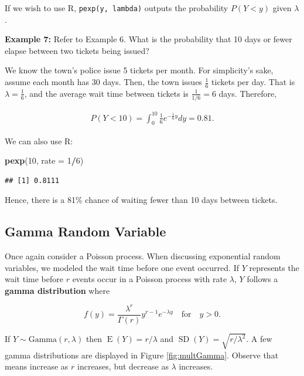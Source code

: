\documentclass[
]{krantz}
\newenvironment{Shaded}{\begin{snugshade}}{\end{snugshade}}
\newcommand{\AttributeTok}[1]{\textcolor[rgb]{0.27,0.27,0.27}{#1}}
\newcommand{\DecValTok}[1]{\textcolor[rgb]{0.06,0.06,0.06}{#1}}
\newcommand{\FunctionTok}[1]{\textcolor[rgb]{0.27,0.27,0.27}{\textbf{#1}}}
\newcommand{\NormalTok}[1]{#1}
\newcommand{\SpecialCharTok}[1]{\textcolor[rgb]{0.43,0.43,0.43}{\textbf{#1}}}
\newcommand{\E}{\operatorname{E}}
\newcommand{\SD}{\operatorname{SD}}
\begin{document}
If we wish to use R, \texttt{pexp(y,\ lambda)} outputs the probability \(P(Y < y)\) given \(\lambda\).

\textbf{Example 7:} Refer to Example 6. What is the probability that 10 days or fewer elapse between two tickets being issued?

We know the town's police issue 5 tickets per month. For simplicity's sake, assume each month has 30 days. Then, the town issues \(\frac{1}{6}\) tickets per day. That is \(\lambda = \frac{1}{6}\), and the average wait time between tickets is \(\frac{1}{1/6} = 6\) days. Therefore,

\begin{align*}
P(Y < 10) = \int_{0}^{10} \textstyle \frac16 e^{-\frac16y} dy = 0.81.
\end{align*}

We can also use R:

\begin{Shaded}
\begin{Highlighting}[]
\FunctionTok{pexp}\NormalTok{(}\DecValTok{10}\NormalTok{, }\AttributeTok{rate =} \DecValTok{1}\SpecialCharTok{/}\DecValTok{6}\NormalTok{)}
\end{Highlighting}
\end{Shaded}

\begin{verbatim}
## [1] 0.8111
\end{verbatim}

Hence, there is a 81\% chance of waiting fewer than 10 days between tickets.

\subsection{Gamma Random Variable}\label{gamma-random-variable}

Once again consider a Poisson process. When discussing exponential random variables, we modeled the wait time before one event occurred. If \(Y\) represents the wait time before \(r\) events occur in a Poisson process with rate \(\lambda\), \(Y\) follows a \textbf{gamma distribution}  where

\begin{equation}
f(y) = \frac{\lambda^r}{\Gamma(r)} y^{r-1} e^{-\lambda y}\quad \textrm{for} \quad y >0.
\label{eq:gammaRV}
\end{equation}

If \(Y \sim \textrm{Gamma}(r, \lambda)\) then \(\E(Y) = r/\lambda\) and \(\SD(Y) = \sqrt{r/\lambda^2}\). A few gamma distributions are displayed in Figure \ref{fig:multGamma}. Observe that means increase as \(r\) increases, but decrease as \(\lambda\) increases.
\end{document}
